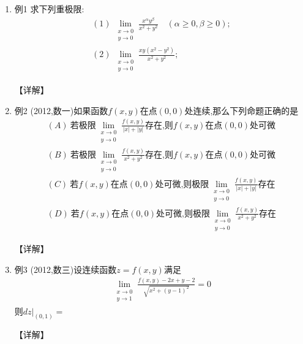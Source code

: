 \documentclass[12pt, a4paper, oneside, UTF8]{ctexbook}
\begin{document}
\begin{enumerate}[label=\arabic*.]
    \item 例1 求下列重极限:
    \begin{align*}
        (1)\ \lim_{\substack{x\to 0\\ y\to 0}}\frac{x^\alpha y^\beta}{x^2+y^2}\quad (\alpha\geq0,\beta\geq0); \\
        (2)\ \lim_{\substack{x\to 0\\ y\to 0}}\frac{xy(x^{2}-y^{2})}{x^{2}+y^{2}};
    \end{align*}
    
    \begin{solution}
    【详解】
    \end{solution}
    
    \item 例2 (2012,数一)如果函数$f(x,y)$在点$(0,0)$处连续,那么下列命题正确的是
    \begin{align*}
        (A)\ \text{若极限}\lim_{\substack{x\to 0\\ y\to 0}}\frac{f(x,y)}{|x|+|y|}\text{存在,则}f(x,y)\text{在点}(0,0)\text{处可微} \\
        (B)\ \text{若极限}\lim_{\substack{x\to 0\\ y\to 0}}\frac{f(x,y)}{x^{2}+y^{2}}\text{存在,则}f(x,y)\text{在点}(0,0)\text{处可微} \\
        (C)\ \text{若}f(x,y)\text{在点}(0,0)\text{处可微,则极限}\lim_{\substack{x\to 0\\ y\to 0}}\frac{f(x,y)}{|x|+|y|}\text{存在} \\
        (D)\ \text{若}f(x,y)\text{在点}(0,0)\text{处可微,则极限}\lim_{\substack{x\to 0\\ y\to 0}}\frac{f(x,y)}{x^{2}+y^{2}}\text{存在}
    \end{align*}
    
    \begin{solution}
    【详解】
    \end{solution}
    
    \item 例3 (2012,数三)设连续函数$z=f(x,y)$满足
    \begin{align*}
        \lim_{\substack{x\to 0\\ y\to 1}}\frac{f(x,y)-2x+y-2}{\sqrt{x^2+(y-1)^2}}=0
    \end{align*}
    则$\left.dz\right|_{(0,1)}=$
    
    \begin{solution}
    【详解】
    \end{solution}
\end{enumerate}
\end{document}
